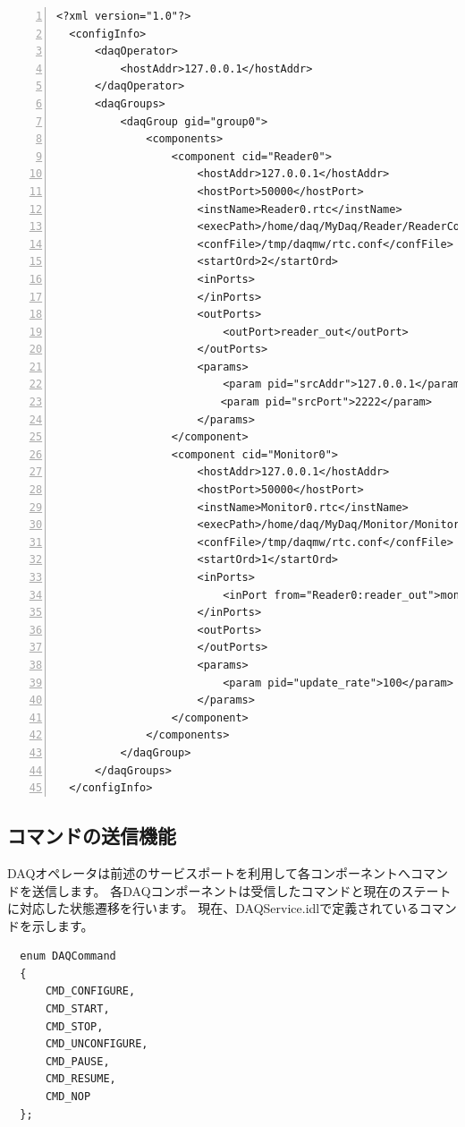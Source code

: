 \documentclass[a4j,10pt,dvips,onecolumn,oneside,final]{jarticle}%
\begin{document}
\begin{Verbatim}[tabsize=4,
    baselinestretch=0.8,
    numbers=left,
    frame=single,
    fontsize=\small,
    framesep=5pt,
    numbersep=5pt]
  <?xml version="1.0"?>
  <configInfo>
      <daqOperator>
          <hostAddr>127.0.0.1</hostAddr>
      </daqOperator>
      <daqGroups>
          <daqGroup gid="group0">
              <components>
                  <component cid="Reader0">
                      <hostAddr>127.0.0.1</hostAddr>
                      <hostPort>50000</hostPort>
                      <instName>Reader0.rtc</instName>
                      <execPath>/home/daq/MyDaq/Reader/ReaderComp</execPath>
                      <confFile>/tmp/daqmw/rtc.conf</confFile>
                      <startOrd>2</startOrd>
                      <inPorts>
                      </inPorts>
                      <outPorts>
                          <outPort>reader_out</outPort>
                      </outPorts>
                      <params>
                          <param pid="srcAddr">127.0.0.1</param>
                     　   <param pid="srcPort">2222</param>
                      </params>
                  </component>
                  <component cid="Monitor0">
                      <hostAddr>127.0.0.1</hostAddr>
                      <hostPort>50000</hostPort>
                      <instName>Monitor0.rtc</instName>
                      <execPath>/home/daq/MyDaq/Monitor/MonitorComp</execPath>
                      <confFile>/tmp/daqmw/rtc.conf</confFile>
                      <startOrd>1</startOrd>
                      <inPorts>
                          <inPort from="Reader0:reader_out">monitor_in</inPort>
                      </inPorts>
                      <outPorts>
                      </outPorts>
                      <params>
                          <param pid="update_rate">100</param>
                      </params>
                  </component>
              </components>
          </daqGroup>
      </daqGroups>
  </configInfo>
\end{Verbatim}

\subsection{コマンドの送信機能}\label{operator-com}
DAQオペレータは前述のサービスポートを利用して各コンポーネントへコマンドを送信します。
各DAQコンポーネントは受信したコマンドと現在のステートに対応した状態遷移を行います。
現在、DAQService.idlで定義されているコマンドを示します。
\begin{Verbatim}
  enum DAQCommand
  {
      CMD_CONFIGURE,
      CMD_START,
      CMD_STOP,
      CMD_UNCONFIGURE,
      CMD_PAUSE,
      CMD_RESUME,
      CMD_NOP
  };
\end{Verbatim}
\end{document}
